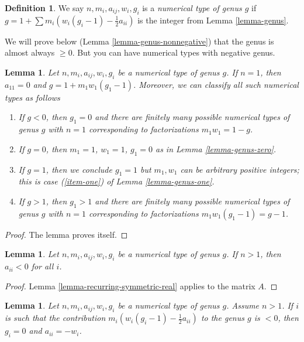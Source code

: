\documentclass[10pt,a4paper]{amsart}
\theoremstyle{plain}
\newtheorem{lemma}[subsection]{Lemma}
\theoremstyle{definition}
\newtheorem{definition}[subsection]{Definition}
\theoremstyle{remark}
\numberwithin{equation}{subsection}
\begin{document}
\begin{definition}
\label{definition-genus}
We say $n, m_i, a_{ij}, w_i, g_i$ is a {\it numerical type of genus $g$}
if $g = 1 + \sum m_i(w_i(g_i - 1) - \frac{1}{2} a_{ii})$ is the integer
from Lemma \ref{lemma-genus}.
\end{definition}

\noindent
We will prove below (Lemma \ref{lemma-genus-nonnegative}) that the genus
is almost always $\geq 0$. But you can have numerical types with
negative genus.

\begin{lemma}
\label{lemma-irreducible}
Let $n, m_i, a_{ij}, w_i, g_i$ be a numerical type of genus $g$.
If $n = 1$, then $a_{11} = 0$ and $g = 1 + m_1w_1(g_1 - 1)$.
Moreover, we can classify all such numerical types as follows
\begin{enumerate}
\item If $g < 0$, then $g_1 = 0$ and there are finitely many possible
numerical types of genus $g$ with $n = 1$ corresponding to factorizations
$m_1w_1 = 1 - g$.
\item If $g = 0$, then $m_1 = 1$, $w_1 = 1$, $g_1 = 0$
as in Lemma \ref{lemma-genus-zero}.
\item If $g = 1$, then we conclude $g_1 = 1$ but $m_1, w_1$ can be arbitrary
positive integers; this is case
(\ref{item-one}) of Lemma \ref{lemma-genus-one}.
\item If $g > 1$, then $g_1 > 1$ and there are finitely many possible
numerical types of genus $g$ with $n = 1$ corresponding to
factorizations $m_1w_1(g_1 - 1) = g - 1$.
\end{enumerate}
\end{lemma}

\begin{proof}
The lemma proves itself.
\end{proof}

\begin{lemma}
\label{lemma-diagonal-negative}
Let $n, m_i, a_{ij}, w_i, g_i$ be a numerical type of genus $g$.
If $n > 1$, then $a_{ii} < 0$ for all $i$.
\end{lemma}

\begin{proof}
Lemma \ref{lemma-recurring-symmetric-real} applies to the matrix $A$.
\end{proof}

\begin{lemma}
\label{lemma-minus-one}
Let $n, m_i, a_{ij}, w_i, g_i$ be a numerical type of genus $g$.
Assume $n > 1$. If $i$ is such that the contribution
$m_i(w_i(g_i - 1) - \frac{1}{2} a_{ii})$
to the genus $g$ is $< 0$, then $g_i = 0$ and $a_{ii} = -w_i$.
\end{lemma}
\end{document}
